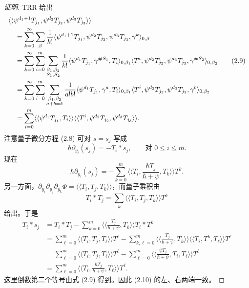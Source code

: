 \begin{proof}[证明]
TRR 给出
\begin{align}
&\langle\langle\psi^{d_1+1}T_{j_1},\psi^{d_2}T_{j_2},\psi^{d_3}T_{j_3}\rangle\rangle\notag\\
&\quad=\sum_{k=0}^{\infty}\sum_{\beta}\frac{1}{k!}\langle\psi^{d_1+1}T_{j_1},\psi^{d_2}T_{j_2},\psi^{d_3}T_{j_3},\gamma^k\rangle_{0,\beta}\notag\\
&\quad=\sum_{k=0}^{\infty}\sum_{i=0}^m\sum_{\substack{\beta_1,\beta_2\\S_1,S_2}}\frac{1}{k!}\langle\psi^{d_1}T_{j_1},\gamma^{\#S_1},T_i\rangle_{0,\beta_1}\langle T^i,\psi^{d_2}T_{j_2},\psi^{d_3}T_{j_3},\gamma^{\#S_2}\rangle_{0,\beta_2}\tag{2.9}\\
&\quad=\sum_{k=0}^{\infty}\sum_{i=0}^m\sum_{\substack{\beta_1,\beta_2\\a+b=k}}\frac{1}{a!b!}\langle\psi^{d_1}T_{j_1},\gamma^a,T_i\rangle_{0,\beta_1}\langle T^i,\psi^{d_2}T_{j_2},\psi^{d_3}T_{j_3},\gamma^b\rangle_{0,\beta_2}\notag\\
&\quad=\sum_{i=0}^m\langle\langle\psi^{d_1}T_{j_1},T_i\rangle\rangle\langle\langle T^i,\psi^{d_2}T_{j_2},\psi^{d_3}T_{j_3}\rangle\rangle.\notag
\end{align}
注意量子微分方程 (2.8) 可对 $s=s_j$ 写成
\begin{equation}
\hbar\partial_{y_i}(s_j)=-T_i*s_j,\qquad\text{对 }0\le i\le m. \tag{2.10}
\end{equation}
现在
\[
\hbar\partial_{y_i}(s_j)=-\sum_{k=0}^m\Big\langle\Big\langle T_i,\frac{\hbar T_j}{\hbar+\psi},T_k\Big\rangle\Big\rangle T^k.
\]
另一方面，$\partial_{y_i}\partial_{y_j}\partial_{y_k}\Phi=\langle\langle T_i,T_j,T_k\rangle\rangle$，而量子乘积由
\[
T_i*T_j=\sum_k\langle\langle T_i,T_j,T_k\rangle\rangle T^k
\]
给出。于是
\begin{align*}
T_i*s_j &= T_i*T_j-\sum_{k=0}^m\Big\langle\Big\langle\frac{T_j}{\hbar+\psi},T_k\Big\rangle\Big\rangle T_i*T^k\\
&= \sum_{\ell=0}^m\langle\langle T_i,T_j,T_\ell\rangle\rangle T^\ell-\sum_{k,\ell=0}^m\Big\langle\Big\langle\frac{T_j}{\hbar+\psi},T_k\Big\rangle\Big\rangle\langle\langle T_i,T^k,T_\ell\rangle\rangle T^\ell\\
&= \sum_{\ell=0}^m\langle\langle T_i,T_j,T_\ell\rangle\rangle T^\ell-\sum_{\ell=0}^m\Big\langle\Big\langle\frac{\psi T_j}{\hbar+\psi},T_i,T_\ell\Big\rangle\Big\rangle T^\ell\\
&= \sum_{\ell=0}^m\Big\langle\Big\langle T_i,\frac{\hbar T_j}{\hbar+\psi},T_\ell\Big\rangle\Big\rangle T^\ell.
\end{align*}
这里倒数第二个等号由式 (2.9) 得到。因此 (2.10) 的左、右两端一致。
\end{proof}

